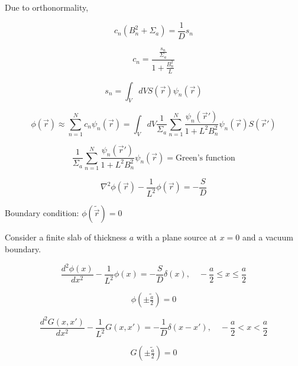 \documentclass[12pt]{article}
\newcommand{\rvec}{\ensuremath{\vec{r}}}
\begin{document}
Due to orthonormality,

\begin{equation*}
c_n(B_n^2 + \Sigma_a) = \frac{1}{D}s_n
\end{equation*}

\begin{equation*}
c_n = \frac{\frac{s_n}{\Sigma_a}}{1+\frac{B_n^2}{L}}
\end{equation*}

\begin{equation*}
s_n = \int_V dV S(\rvec)\psi_n(\rvec)
\end{equation*}

\begin{equation*}
\phi(\rvec) \approx \sum_{n=1}^N c_n\psi_n(\rvec) = 
\int_V dV \frac{1}{\Sigma_a} \sum_{n=1}^N \frac{\psi_n(\rvec')}{1+L^2B_n^2}\psi_n(\rvec)S(\rvec')
\end{equation*}

\begin{equation*}
\frac{1}{\Sigma_a} \sum_{n=1}^N \frac{\psi_n(\rvec')}{1+L^2B_n^2}\psi_n(\rvec) = \text{Green's function}
\end{equation*}


\begin{equation*}
\nabla^2\phi(\rvec) - \frac{1}{L^2}\phi(\rvec) = -\frac{S}{D}
\end{equation*}

Boundary condition: $\phi(\tilde{\rvec}) = 0$


Consider a finite slab of thickness $a$ with a plane source at $x=0$ and a vacuum boundary.

\begin{equation*}
\frac{d^2\phi(x)}{dx^2} - \frac{1}{L^2}\phi(x) = -\frac{S}{D}\delta(x),\quad
-\frac{a}{2} \leq x \leq \frac{a}{2}
\end{equation*}

\begin{equation*}
\phi\left(\pm\tilde{\tfrac{a}{2}}\right) = 0
\end{equation*}

\begin{equation*}
\frac{d^2G(x,x')}{dx^2} - \frac{1}{L^2}G(x,x') = -\frac{1}{D}\delta(x-x'),\quad
-\frac{a}{2} < x < \frac{a}{2}
\end{equation*}

\begin{equation*}
G\left(\pm\tilde{\tfrac{a}{2}}\right) = 0
\end{equation*}
\end{document}
